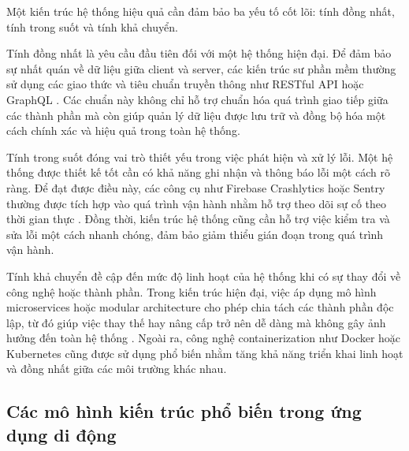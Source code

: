         \hspace*{0.8cm}Một kiến trúc hệ thống hiệu quả cần đảm bảo ba yếu tố cốt lõi: tính đồng nhất, tính trong suốt và tính khả chuyển.
    
        \vspace{0.5em}
    
        \hspace*{0.8cm}Tính đồng nhất là yêu cầu đầu tiên đối với một hệ thống hiện đại. Để đảm bảo sự nhất quán về dữ liệu giữa client và server, các kiến trúc sư phần mềm thường sử dụng các giao thức và tiêu chuẩn truyền thông như RESTful API hoặc GraphQL \cite{restgraphql}. Các chuẩn này không chỉ hỗ trợ chuẩn hóa quá trình giao tiếp giữa các thành phần mà còn giúp quản lý dữ liệu được lưu trữ và đồng bộ hóa một cách chính xác và hiệu quả trong toàn hệ thống.
      
        \vspace{0.5em}
      
        \hspace*{0.8cm}Tính trong suốt đóng vai trò thiết yếu trong việc phát hiện và xử lý lỗi. Một hệ thống được thiết kế tốt cần có khả năng ghi nhận và thông báo lỗi một cách rõ ràng. Để đạt được điều này, các công cụ như Firebase Crashlytics hoặc Sentry thường được tích hợp vào quá trình vận hành nhằm hỗ trợ theo dõi sự cố theo thời gian thực \cite{firebasecrashlytics}. Đồng thời, kiến trúc hệ thống cũng cần hỗ trợ việc kiểm tra và sửa lỗi một cách nhanh chóng, đảm bảo giảm thiểu gián đoạn trong quá trình vận hành.
      
        \vspace{0.5em}
      
        \hspace*{0.8cm}Tính khả chuyển đề cập đến mức độ linh hoạt của hệ thống khi có sự thay đổi về công nghệ hoặc thành phần. Trong kiến trúc hiện đại, việc áp dụng mô hình microservices hoặc modular architecture cho phép chia tách các thành phần độc lập, từ đó giúp việc thay thế hay nâng cấp trở nên dễ dàng mà không gây ảnh hưởng đến toàn hệ thống \cite{microservices}. Ngoài ra, công nghệ containerization như Docker hoặc Kubernetes cũng được sử dụng phổ biến nhằm tăng khả năng triển khai linh hoạt và đồng nhất giữa các môi trường khác nhau.
      

    \subsection{Các mô hình kiến trúc phổ biến trong ứng dụng di động}
    \renewcommand{\labelitemi}{--}
    
